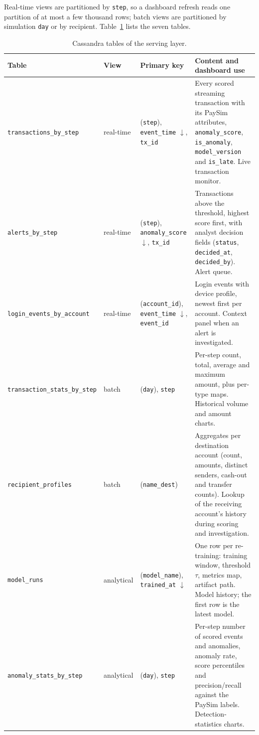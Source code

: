 \documentclass[titlepage]{article}
\begin{document}
Real-time views are partitioned by \texttt{step}, so a dashboard refresh reads one partition of at most a few thousand rows; batch views are partitioned by simulation \texttt{day} or by recipient. 
Table~\ref{tab:cassandra_tables} lists the seven tables.

\begin{table}[H]
    \centering
    \caption{Cassandra tables of the serving layer.}
    \label{tab:cassandra_tables}
    \small
    \renewcommand{\arraystretch}{1.3}
    \begin{tabularx}{\textwidth}{@{}l l >{\RaggedRight\arraybackslash}p{3.8cm} X@{}}
        \toprule
        \textbf{Table} & \textbf{View} & \textbf{Primary key} & \textbf{Content and dashboard use} \\
        \midrule
        \texttt{transactions\_by\_step} & real-time & (\texttt{step}), \texttt{event\_time} $\downarrow$, \texttt{tx\_id} & Every scored streaming transaction with its PaySim attributes, \texttt{anomaly\_score}, \texttt{is\_anomaly}, \texttt{model\_version} and \texttt{is\_late}. Live transaction monitor. \\
        \addlinespace
        \texttt{alerts\_by\_step} & real-time & (\texttt{step}), \texttt{anomaly\_score} $\downarrow$, \texttt{tx\_id} & Transactions above the threshold, highest score first, with analyst decision fields (\texttt{status}, \texttt{decided\_at}, \texttt{decided\_by}). Alert queue. \\
        \addlinespace
        \texttt{login\_events\_by\_account} & real-time & (\texttt{account\_id}), \texttt{event\_time} $\downarrow$, \texttt{event\_id} & Login events with device profile, newest first per account. Context panel when an alert is investigated. \\
        \addlinespace
        \texttt{transaction\_stats\_by\_step} & batch & (\texttt{day}), \texttt{step} & Per-step count, total, average and maximum amount, plus per-type maps. Historical volume and amount charts. \\
        \addlinespace
        \texttt{recipient\_profiles} & batch & (\texttt{name\_dest}) & Aggregates per destination account (count, amounts, distinct senders, cash-out and transfer counts). Lookup of the receiving account's history during scoring and investigation. \\
        \addlinespace
        \texttt{model\_runs} & analytical & (\texttt{model\_name}), \texttt{trained\_at} $\downarrow$ & One row per re-training: training window, threshold $\tau$, metrics map, artifact path. Model history; the first row is the latest model. \\
        \addlinespace
        \texttt{anomaly\_stats\_by\_step} & analytical & (\texttt{day}), \texttt{step} & Per-step number of scored events and anomalies, anomaly rate, score percentiles and precision/recall against the PaySim labels. Detection-statistics charts. \\
        \bottomrule
    \end{tabularx}
\end{table}
\end{document}
